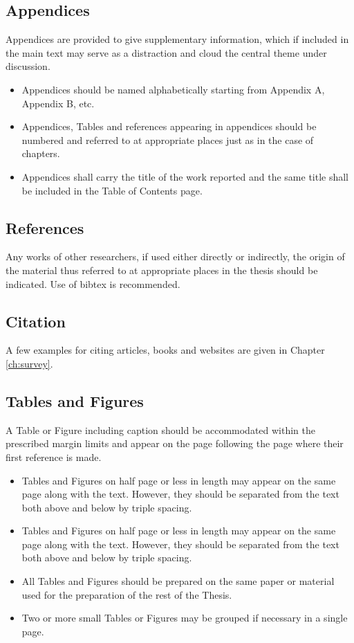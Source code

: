 \subsection{Appendices}
Appendices are provided to give supplementary information, which if included in the main text may serve as a distraction and cloud the central theme under discussion.
\begin{itemize}
 \item Appendices should be named alphabetically starting from Appendix A, Appendix B, etc.
\item  Appendices, Tables and references appearing in appendices should be numbered and referred to at appropriate places just as in the case of chapters.
\item Appendices shall carry the title of the work reported and the same title shall be included in the Table of Contents page.
\end{itemize}
\subsection{References}
Any works of other researchers, if used either directly or indirectly, the origin of the material thus referred to at appropriate places in the thesis should be indicated. Use of bibtex is recommended.
\subsection{Citation}
A few examples for citing articles, books and websites are given in Chapter \ref{ch:survey}. 
\subsection{Tables and Figures}
A Table or Figure including caption should be accommodated within the prescribed margin limits and appear on the page following the page where their first reference is made.
\begin{itemize}
 \item Tables and Figures on half page or less in length may appear on the same page along with the text. However, they should be separated from the text both above and below by triple spacing.
\item Tables and Figures on half page or less in length may appear on the same page along with the text. However, they should be separated from the text both above and below by triple spacing.
\item All Tables and Figures should be prepared on the same paper or material used for the preparation of the rest of the Thesis.
\item Two or more small Tables or Figures may be grouped if necessary in a single page.
\end{itemize}
